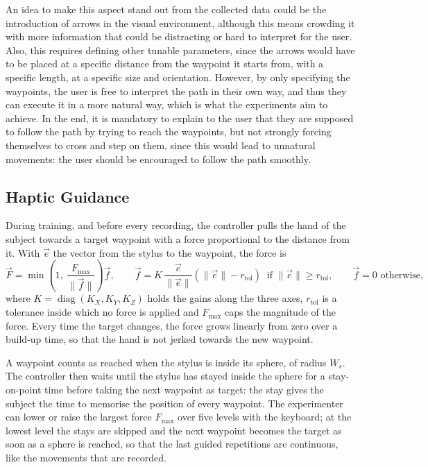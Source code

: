 \documentclass[12pt]{report}
\begin{document}
An idea to make this aspect stand out from the collected data could be the introduction of arrows in the visual environment, although this means crowding it with more information that could be distracting or hard to interpret for the user. Also, this requires defining other tunable parameters, since the arrows would have to be placed at a specific distance from the waypoint it starts from, with a specific length, at a specific size and orientation. However, by only specifying the waypoints, the user is free to interpret the path in their own way, and thus they can execute it in a more natural way, which is what the experiments aim to achieve. In the end, it is mandatory to explain to the user that they are supposed to follow the path by trying to reach the waypoints, but not strongly forcing themselves to cross and step on them, since this would lead to unnatural movements: the user should be encouraged to follow the path smoothly.

\subsection{Haptic Guidance}
\label{sec:guidance}
During training, and before every recording, the controller pulls the hand of the subject towards a target waypoint with a force proportional to the distance from it. With $\vec e$ the vector from the stylus to the waypoint, the force is
\begin{equation}
    \vec F = \min\left(1,\ \frac{F_{\max}}{\lVert\vec f\rVert}\right)\vec f,\qquad
    \vec f = K\,\frac{\vec e}{\lVert\vec e\rVert}\left(\lVert\vec e\rVert-r_{\mathrm{tol}}\right)\ \text{ if } \lVert\vec e\rVert\ge r_{\mathrm{tol}},\qquad \vec f=0 \text{ otherwise},
\end{equation}
where $K=\operatorname{diag}(K_X,K_Y,K_Z)$ holds the gains along the three axes, $r_{\mathrm{tol}}$ is a tolerance inside which no force is applied and $F_{\max}$ caps the magnitude of the force. Every time the target changes, the force grows linearly from zero over a build-up time, so that the hand is not jerked towards the new waypoint.

A waypoint counts as reached when the stylus is inside its sphere, of radius $W_s$. The controller then waits until the stylus has stayed inside the sphere for a stay-on-point time before taking the next waypoint as target: the stay gives the subject the time to memorise the position of every waypoint. The experimenter can lower or raise the largest force $F_{\max}$ over five levels with the keyboard; at the lowest level the stays are skipped and the next waypoint becomes the target as soon as a sphere is reached, so that the last guided repetitions are continuous, like the movements that are recorded.
\end{document}
